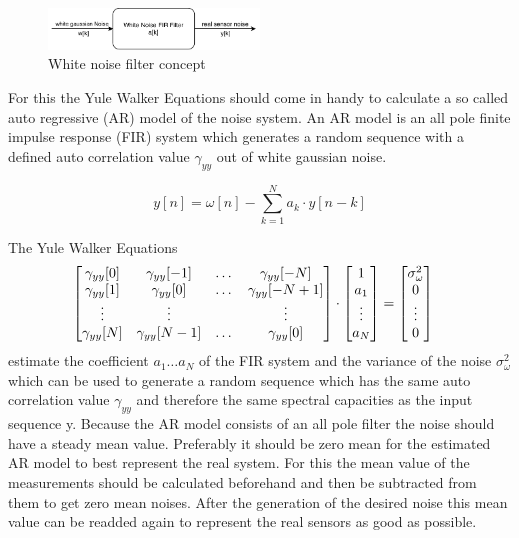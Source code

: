   \begin{figure}[h!]
 \centering
 \includegraphics[width=0.5\textwidth]{./Pictures/WhiteNoiseFilter.pdf}
 \caption{White noise filter concept}
 \label{fig:WhiteNoiseFilter}
\end{figure}


  For this the Yule Walker Equations should come in handy to calculate a so called auto regressive (AR) model of the noise system.
  An AR model is an all pole finite impulse response (FIR) system which generates a random sequence with a defined auto correlation value $\gamma_{yy}$ out of white gaussian noise.

  $$ y[n] = \omega[n] - \sum_{k=1}^{N} a_k \cdot y[n-k]  $$

  The Yule Walker Equations
  \begin{align*}
    \begin{bmatrix}
     \gamma_{yy}[0] & \gamma_{yy}[-1] & \dots & \gamma_{yy}[-N] \\
     \gamma_{yy}[1] & \gamma_{yy}[0] & \dots & \gamma_{yy}[-N+1] \\
     \vdots 		& \vdots 	& 	& \vdots	\\
     \gamma_{yy}[N] & \gamma_{yy}[N-1] & \dots & \gamma_{yy}[0]
    \end{bmatrix}
    & \cdot
    \begin{bmatrix}
     1 \\
     a_1 \\
     \vdots \\
     a_N
    \end{bmatrix}
    =
    \begin{bmatrix}
     \sigma^2_\omega \\
     0 \\
     \vdots \\
     0
    \end{bmatrix}
    \hfill
  \end{align*}
  \hfill
  estimate the coefficient $a_1 \dots a_N $ of the FIR system and the variance of the noise $\sigma^2_\omega $ which can be used to generate a random sequence which has the same auto correlation value $\gamma_{yy}$ and therefore the same spectral capacities as the input sequence y.
  Because the AR model consists of an all pole filter the noise should have a steady mean value. Preferably it should be zero mean for the estimated AR model to best represent the real system.
  For this the mean value of the measurements should be calculated beforehand and then be subtracted from them to get zero mean noises.
  After the generation of the desired noise this mean value can be readded again to represent the real sensors as good as possible.

